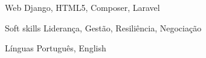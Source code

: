 \begin{cvskills}
\cvskill
{Web} %
{Django, HTML5, Composer, Laravel} %


\cvskill
{Soft skills} %
{Liderança, Gestão, Resiliência, Negociação} %


\cvskill
{Línguas} %
{Português, English} %


\end{cvskills}
